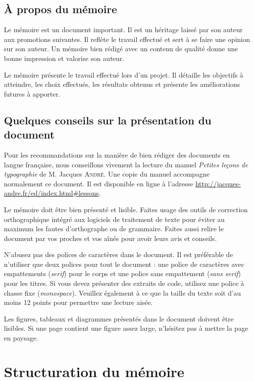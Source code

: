 \documentclass[12pt]{article}
\begin{document}
\subsection{\`A propos du mémoire}
Le mémoire est un document important. Il est un héritage laissé par son auteur aux promotions suivantes. Il reflète le travail effectué et sert à se faire une opinion sur son auteur. Un mémoire bien rédigé avec un contenu de qualité donne une bonne impression et valorise son auteur.

Le mémoire présente le travail effectué lors d'un projet. Il détaille les objectifs à atteindre, les choix effectués, les résultats obtenus et présente les améliorations futures à apporter.

\subsection{Quelques conseils sur la présentation du document}
Pour les recommandations sur la manière de bien rédiger des documents en langue française, nous conseillons vivement la lecture du manuel \textit{Petites leçons de typographie} de M. Jacques \textsc{André}. Une copie du manuel accompagne normalement ce document. Il est disponible en ligne à l'adresse \url{http://jacques-andre.fr/ed/index.html\#lessons}.

Le mémoire doit être bien présenté et lisible. Faites usage des outils de correction orthographique intégré aux logiciels de traitement de texte pour éviter au maximum les fautes d'orthographe ou de grammaire. Faites aussi relire le document par vos proches et vos aînés pour avoir leurs avis et conseils. 

N'abusez pas des polices de caractères dans le document. Il est préférable de n'utiliser que deux polices pour tout le document : une police de caractères avec empattements (\textit{serif}) pour le corps et une police sans empattement (\textit{sans serif}) pour les titres. Si vous devez présenter des extraits de code, utilisez une police à chasse fixe (\textit{monospace}). Veuillez également à ce que la taille du texte soit d'au moins 12 points pour permettre une lecture aisée.

Les figures, tableaux et diagrammes présentés dans le document doivent être lisibles. Si une page contient une figure assez large, n'hésitez pas à mettre la page en paysage.

\section{Structuration du mémoire}
\end{document}
